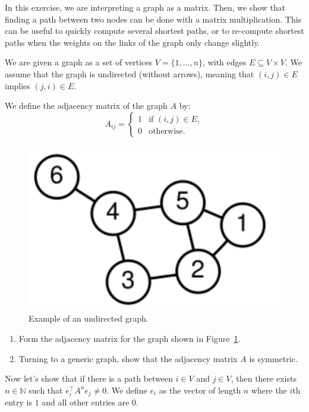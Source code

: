 
In this exercise, we are interpreting a graph as a matrix. 
Then, we show that finding a path between two nodes can be done with a matrix multiplication.  
This can be useful to quickly compute several shortest paths, or to re-compute shortest paths when the weights on the links of the graph only change slightly.

We are given a graph as a set of vertices $V = \{1,...,n\}$, with edges $E \subseteq V \times V$. We assume that the graph is undirected (without arrows), meaning that $(i,j)\in E$ implies $(j,i)\in E$.

We define the adjacency matrix of the graph $A$ by:
\[
A_{ij} = \left\{ 
\begin{array}{ll}
1 & \mbox{if } (i,j) \in E, \\
0 & \mbox{otherwise.}
\end{array}
\right.
\]

\begin{figure}[h]
\centering
\includegraphics[width=.4\textwidth]{figures/UndirectedGraph.png}
\caption[Graph example]{Example of an undirected graph.}
\label{fig:symm-graph}
\end{figure}

\begin{enumerate}
\item Form the adjacency matrix for the graph shown in Figure~\ref{fig:symm-graph}.

\sol{}
\item Turning to a generic graph, show that the adjacency matrix $A$ is symmetric.

\sol{}
\end{enumerate}

Now let's show that if there is a path between $i\in V$ and $j\in V$, then there exists $n\in \mathbb{N}$ such that $e_i^\top A^n e_j \neq 0$. We define $e_i$ as the vector of length $n$ where the $i$th entry is $1$ and all other entries are $0$. 

